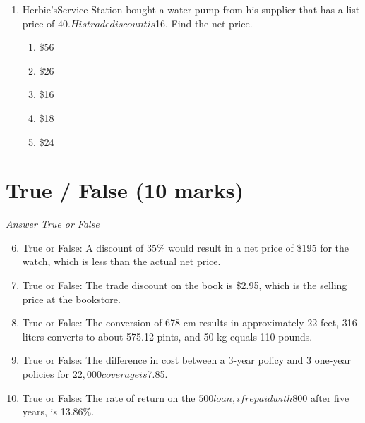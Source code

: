 \documentclass[12pt]{article}
\begin{document}
\begin{enumerate}[label=\arabic*.]
\begin{enumerate}[label=(\alph*)]
    \item equitably manage the sales bonus pool
    \item increase the competitiveness within the sales team
    \item create multiple points of contact between the customer and the company
    \item distribute the work involved in managing an account
    \item reduce the workload of individual salespeople
\end{enumerate}
\item Herbie'sService Station bought a water pump from his supplier that has a list price of $40. His trade discount is $16. Find the net price.
\begin{enumerate}[label=(\alph*)]
    \item \$56
    \item \$26
    \item \$16
    \item \$18
    \item \$24
\end{enumerate}
\end{enumerate}

\section*{True / False (10 marks)}
\textit{Answer True or False}
\begin{enumerate}[label=\arabic*.]
\setcounter{enumi}{5}
\item True or False: A discount of 35\% would result in a net price of \$195 for the watch, which is less than the actual net price.
\item True or False: The trade discount on the book is \$2.95, which is the selling price at the bookstore.
\item True or False: The conversion of 678 cm results in approximately 22 feet, 316 liters converts to about 575.12 pints, and 50 kg equals 110 pounds.
\item True or False: The difference in cost between a 3-year policy and 3 one-year policies for $22,000 coverage is $7.85.
\item True or False: The rate of return on the $500 loan, if repaid with $800 after five years, is 13.86\%.
\end{enumerate}
\end{document}
